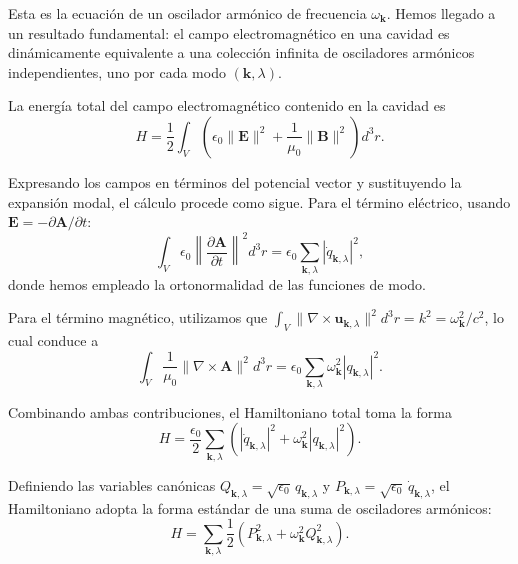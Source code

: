     Esta es la ecuación de un oscilador armónico de frecuencia $\omega_{\mathbf{k}}$. Hemos llegado a un resultado fundamental: el campo electromagnético en una cavidad es dinámicamente equivalente a una colección infinita de osciladores armónicos independientes, uno por cada modo $(\mathbf{k}, \lambda)$.

    La energía total del campo electromagnético contenido en la cavidad es \cite{Jackson1999}
    \begin{equation}
        H = \frac{1}{2}\int_V \left(\epsilon_0 \|\mathbf{E}\|^2 + \frac{1}{\mu_0}\|\mathbf{B}\|^2\right) d^3r.
    \end{equation}
    
    Expresando los campos en términos del potencial vector y sustituyendo la expansión modal, el cálculo procede como sigue. Para el término eléctrico, usando $\mathbf{E} = -\partial\mathbf{A}/\partial t$:
    \begin{equation}
        \int_V \epsilon_0 \left\|\frac{\partial \mathbf{A}}{\partial t}\right\|^2 d^3r = \epsilon_0 \sum_{\mathbf{k},\lambda} |\dot{q}_{\mathbf{k},\lambda}|^2,
    \end{equation}
    donde hemos empleado la ortonormalidad de las funciones de modo.
    
    Para el término magnético, utilizamos que $\int_V \|\nabla \times \mathbf{u}_{\mathbf{k},\lambda}\|^2 d^3r = k^2 = \omega_{\mathbf{k}}^2/c^2$, lo cual conduce a
    \begin{equation}
        \int_V \frac{1}{\mu_0}\|\nabla \times \mathbf{A}\|^2 d^3r = \epsilon_0 \sum_{\mathbf{k},\lambda} \omega_{\mathbf{k}}^2 |q_{\mathbf{k},\lambda}|^2.
    \end{equation}
    
    Combinando ambas contribuciones, el Hamiltoniano total toma la forma
    \begin{equation}
        H = \frac{\epsilon_0}{2} \sum_{\mathbf{k},\lambda} \left(|\dot{q}_{\mathbf{k},\lambda}|^2 + \omega_{\mathbf{k}}^2 |q_{\mathbf{k},\lambda}|^2\right).
    \end{equation}
    
    Definiendo las variables canónicas $Q_{\mathbf{k},\lambda} = \sqrt{\epsilon_0} \, q_{\mathbf{k},\lambda}$ y $P_{\mathbf{k},\lambda} = \sqrt{\epsilon_0} \, \dot{q}_{\mathbf{k},\lambda}$, el Hamiltoniano adopta la forma estándar de una suma de osciladores armónicos:
    \begin{equation}
        H = \sum_{\mathbf{k},\lambda} \frac{1}{2}\left(P_{\mathbf{k},\lambda}^2 + \omega_{\mathbf{k}}^2 Q_{\mathbf{k},\lambda}^2\right).
    \end{equation}

